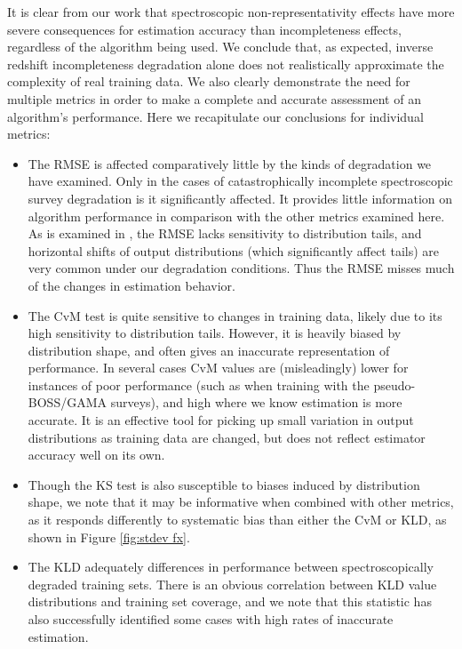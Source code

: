 \documentclass[fleqn,usenatbib,useAMS]{mnras}
\newcommand{\refresponse}[1]{{\color{black}{#1}}}
\begin{document}
It is clear from our work that spectroscopic non-representativity effects have more severe consequences for \refresponse{photo-$z$} estimation accuracy than incompleteness effects, regardless of the algorithm being used. We conclude that, as expected, inverse redshift incompleteness degradation alone does not realistically approximate the complexity of real training data.
We also clearly demonstrate the need for multiple metrics in order to make a complete and accurate assessment of an algorithm's performance. {Here we recapitulate our conclusions for individual metrics:}

\begin{itemize}
\item The RMSE is affected comparatively little by the kinds of degradation we have examined. Only in the cases of catastrophically incomplete spectroscopic survey degradation is it significantly affected. It provides little information on algorithm performance in comparison with the other metrics examined here. As is examined in \citet{malz_approximating_2018}, the RMSE lacks sensitivity to distribution tails, and horizontal shifts of output distributions (which significantly affect tails) are very common under our degradation conditions. Thus the RMSE misses much of the changes in estimation behavior. 
\item The CvM test is quite sensitive to changes in training data, likely due to its high sensitivity to distribution tails. However, it is heavily biased by distribution shape, and often gives an inaccurate representation of performance. In several cases CvM values are (misleadingly) lower for instances of poor performance (such as when training with the pseudo-BOSS/GAMA surveys), and high where we know estimation is more accurate. It is an effective tool for picking up small variation in output distributions as training data are changed, but does not reflect estimator accuracy well on its own. 
\item Though the KS test is also susceptible to biases induced by distribution shape, we note that it may be informative when combined with other metrics, as it responds differently to systematic bias than either the CvM or KLD, as shown in Figure \ref{fig:stdev fx}. 
\item The KLD adequately \refresponse{reflects} differences in performance between spectroscopically degraded training sets. There is an obvious correlation between KLD value distributions and training set coverage, and we note that this statistic has also successfully identified some cases with high rates of inaccurate estimation. 

\end{itemize}
\end{document}
